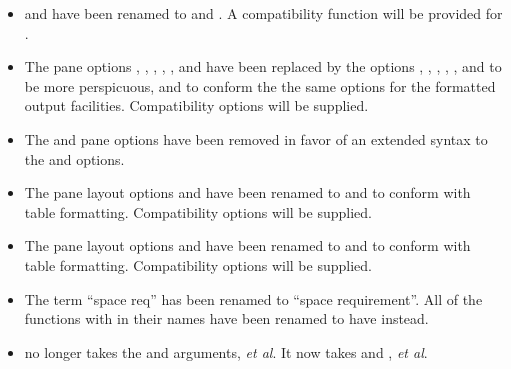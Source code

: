 \begin{itemize}
\item {} and  have been renamed to
 and .  A compatibility function will be provided
for .

\item The pane options , , , , , and
 have been replaced by the options , ,
, , , and  to be more
perspicuous, and to conform the the same options for the formatted output
facilities.  Compatibility options will be supplied.

\item The  and  pane options have been removed in favor
of an extended syntax to the  and  options.

\item The pane layout options  and  have been renamed to
 and  to conform with table formatting.  Compatibility
options will be supplied.

\item The pane layout options  and  have been renamed to
 and  to conform with table formatting.
Compatibility options will be supplied.

\item The term ``space req'' has been renamed to ``space requirement''.  All of
the functions with  in their names have been renamed to have
 instead.

\item {} no longer takes the  and 
arguments, {\it et al}.  It now takes  and , {\it et al}.
\end{itemize}
